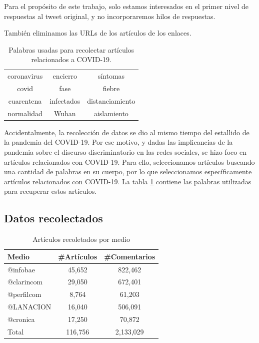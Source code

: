 Para el propósito de este trabajo, solo estamos interesados en el primer nivel de respuestas al tweet original, y no incorporaremos hilos de respuestas.

También eliminamos las URLs de los artículos de los enlaces.




\begin{table}[t]
    \centering
    \begin{tabular}{ c|c|c }
        coronavirus  &  encierro          & síntomas \\
        covid        &  fase              & fiebre   \\
        cuarentena   &  infectados        & distanciamiento     \\
        normalidad   &  Wuhan             & aislamiento\\
    \end{tabular}
    \caption{Palabras usadas para recolectar artículos relacionados a COVID-19.\label{tab:article_words}}
\end{table}


Accidentalmente, la recolección de datos se dio al mismo tiempo del estallido de la pandemia del COVID-19. Por ese motivo, y dadas las implicancias de la pandemia sobre el discurso discriminatorio en las redes sociales, se hizo foco en artículos relacionados con COVID-19. Para ello, seleccionamos artículos buscando una cantidad de palabras en su cuerpo, por lo que seleccionamos específicamente artículos relacionados con COVID-19. La tabla \ref{tab:article_words} contiene las palabras utilizadas para recuperar estos artículos.

\subsection{Datos recolectados}

\begin{table}[t]
    \centering
    \begin{tabular}{l|c|c}
    Medio      & \#Artículos & \#Comentarios \\
    \hline
    @infobae   &  45,652   &  822,462 \\
    @clarincom &  29,050   &  672,401 \\
    @perfilcom &  8,764    &  61,203  \\
    @LANACION  &  16,040   &  506,091 \\
    @cronica   &  17,250   &  70,872 \\
    \hline
    Total      & 116,756  & 2,133,029 \\
    \end{tabular}
    \caption{Artículos recoletados por medio}
    \label{tab:articulos_recoletados_por_medio}
\end{table}


